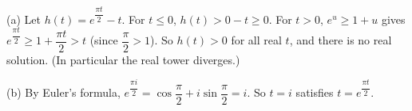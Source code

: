 (a) Let $h(t)=e^{\dfrac{\pi t}2}-t$. For $t\le0$, $h(t)>0-t\ge0$. For $t>0$, $e^u\ge1+u$ gives $e^{\dfrac{\pi t}2}\ge1+\dfrac{\pi t}2>t$ (since $\dfrac\pi2>1$). So $h(t)>0$ for all real $t$, and there is no real solution. (In particular the real tower diverges.)

(b) By Euler's formula, $e^{\dfrac{\pi i}2}=\cos\dfrac\pi2+i\sin\dfrac\pi2=i$. So $t=\boxed{i}$ satisfies $t=e^{\dfrac{\pi t}2}$.
